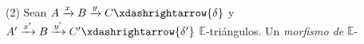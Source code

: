 \documentclass[preview]{standalone}
\begin{document}
\begin{center}
(2) Sean $A\xrightarrow{x}B\xrightarrow{y}C\xdashrightarrow{\delta}$ y $A'\xrightarrow{x'}B\xrightarrow{y'}C'\xdashrightarrow{\delta'}$ $\mathbb{E}$-triángulos. Un \emph{morfismo de} $\mathbb{E}$-
\end{center}
\end{document}
